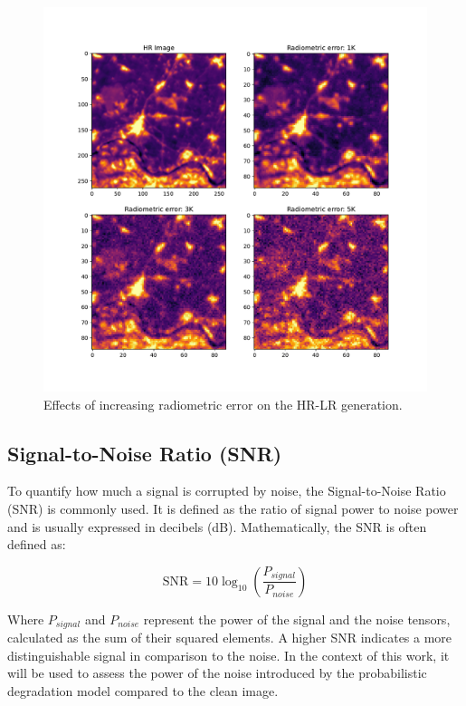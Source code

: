         \begin{figure}[h!]
            \centering
            \includegraphics[width=\textwidth]{Includes/4-radiometric_noise_example.pdf}
            \caption{Effects of increasing radiometric error on the HR-LR generation.}
            \label{fig:4-radiometric_noise_example}
        \end{figure}
        
    

    \subsection{Signal-to-Noise Ratio (SNR)}

        To quantify how much a signal is corrupted by noise, the Signal-to-Noise Ratio (SNR) is commonly used. It is defined as the ratio of signal power to noise power and is usually expressed in decibels (dB). Mathematically, the SNR is often defined as:

        \[ \text{SNR} = 10 \log_{10} \left( \frac{P_{signal}}{P_{noise}} \right) \]

        Where $P_{signal}$ and $P_{noise}$ represent the power of the signal and the noise tensors, calculated as the sum of their squared elements.
        A higher SNR indicates a more distinguishable signal in comparison to the noise. In the context of this work, it will be used to assess the power of the noise introduced by the probabilistic degradation model compared to the clean image.


